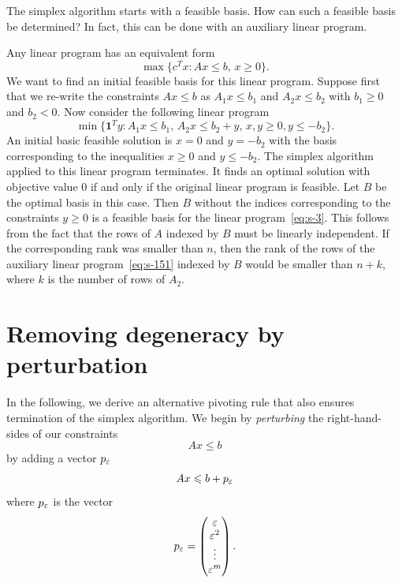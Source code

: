 The simplex algorithm starts with a feasible basis. How can such a feasible basis be determined? In fact, this can be done with an auxiliary linear program. 

Any linear program has an equivalent form 
\begin{equation}
  \label{eq:s-3}
  \max\{ c^Tx \colon Ax \leq b, \, x \geq 0\}. 
\end{equation}
  We want to find an initial feasible basis for this linear program. Suppose first that we re-write the constraints $Ax \leq b$ as $A_1x\leq b_1$ and $A_2x\leq b_2$ with $b_1 \geq 0$ and $b_2<0$. Now consider the following linear program
  \begin{equation}
    \label{eq:s-151}    
  \min\{ \mathbf{1}^Ty \colon A_1x \leq b_1, \, A_2x \leq b_2 +y, \, x,y \geq 0, y \leq -b_2\}. 
\end{equation}
An initial basic feasible solution is $x=0$ and $y= -b_2$ with the basis corresponding to the inequalities $x\geq 0$ and $y \leq -b_2$. The simplex algorithm applied to this linear program terminates. It finds an optimal solution with objective value $0$ if and only if the original linear program is feasible. Let $B$ be the optimal basis in this case. Then $B$ without the indices corresponding to the constraints $y\geq 0$ is a feasible basis for the linear program~\eqref{eq:s-3}.  This follows from the fact that the rows of $A$ indexed by $B$ must be linearly independent. If the corresponding rank was smaller than $n$, then the rank of the rows of the auxiliary linear program~\eqref{eq:s-151} indexed by $B$ would be smaller than $n+k$, where $k$ is the number of rows of $A_2$. 


\section{Removing degeneracy by perturbation}
\label{sec:remov-degen-pert}

In the following, we derive an alternative pivoting rule that also ensures termination of the simplex algorithm. We begin by \emph{perturbing} the right-hand-sides of our constraints 
\begin{equation}
  \label{eq:pert-2}
  Ax \leq b
\end{equation}
by adding a vector $p_{\varepsilon}$ 
\begin{equation}
  \label{eq:per-1}
  Ax \leqslant b + p_{\varepsilon} 
\end{equation}
where $p_{\varepsilon}$ is the vector 
\begin{displaymath}
p_{\varepsilon} = 
  \begin{pmatrix}
    {\varepsilon}\\ {\varepsilon}^2\\ \vdots \\ {\varepsilon}^m
  \end{pmatrix}.
\end{displaymath}

